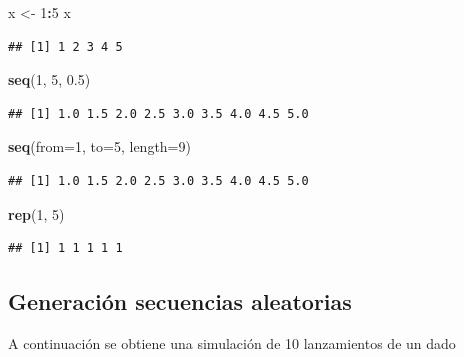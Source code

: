 \documentclass[]{book}
\newenvironment{Shaded}{\begin{snugshade}}{\end{snugshade}}
\newcommand{\DataTypeTok}[1]{\textcolor[rgb]{0.13,0.29,0.53}{#1}}
\newcommand{\DecValTok}[1]{\textcolor[rgb]{0.00,0.00,0.81}{#1}}
\newcommand{\FloatTok}[1]{\textcolor[rgb]{0.00,0.00,0.81}{#1}}
\newcommand{\KeywordTok}[1]{\textcolor[rgb]{0.13,0.29,0.53}{\textbf{#1}}}
\newcommand{\NormalTok}[1]{#1}
\newcommand{\OperatorTok}[1]{\textcolor[rgb]{0.81,0.36,0.00}{\textbf{#1}}}
\newcommand{\StringTok}[1]{\textcolor[rgb]{0.31,0.60,0.02}{#1}}
\begin{document}
\begin{Shaded}
\begin{Highlighting}[]
\NormalTok{x <-}\StringTok{ }\DecValTok{1}\OperatorTok{:}\DecValTok{5}
\NormalTok{x}
\end{Highlighting}
\end{Shaded}

\begin{verbatim}
## [1] 1 2 3 4 5
\end{verbatim}

\begin{Shaded}
\begin{Highlighting}[]
\KeywordTok{seq}\NormalTok{(}\DecValTok{1}\NormalTok{, }\DecValTok{5}\NormalTok{, }\FloatTok{0.5}\NormalTok{)}
\end{Highlighting}
\end{Shaded}

\begin{verbatim}
## [1] 1.0 1.5 2.0 2.5 3.0 3.5 4.0 4.5 5.0
\end{verbatim}

\begin{Shaded}
\begin{Highlighting}[]
\KeywordTok{seq}\NormalTok{(}\DataTypeTok{from=}\DecValTok{1}\NormalTok{, }\DataTypeTok{to=}\DecValTok{5}\NormalTok{, }\DataTypeTok{length=}\DecValTok{9}\NormalTok{)}
\end{Highlighting}
\end{Shaded}

\begin{verbatim}
## [1] 1.0 1.5 2.0 2.5 3.0 3.5 4.0 4.5 5.0
\end{verbatim}

\begin{Shaded}
\begin{Highlighting}[]
\KeywordTok{rep}\NormalTok{(}\DecValTok{1}\NormalTok{, }\DecValTok{5}\NormalTok{)}
\end{Highlighting}
\end{Shaded}

\begin{verbatim}
## [1] 1 1 1 1 1
\end{verbatim}

\hypertarget{generacion-secuencias-aleatorias}{%
\subsection{Generación secuencias aleatorias}\label{generacion-secuencias-aleatorias}}

A continuación se obtiene una simulación de 10 lanzamientos de un dado
\end{document}
